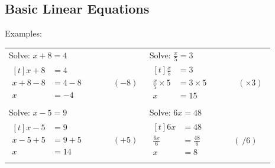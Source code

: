 \documentclass[a4paper,12pt]{article}
\renewcommand{\arraystretch}{1.5}
\begin{document}
\subsection{Basic Linear Equations}
Examples:
\renewcommand{\tabcolsep}{16pt}
\renewcommand{\arraystretch}{2}
\begin{center}
\begin{tabular}{ p{6cm} | p{6cm} }\hline
Solve: $x+8 = 4$ & Solve: $\displaystyle \frac{x}{5}=3$ \\
$\begin{aligned}[t] %
x + 8 &= 4 &\\
x + 8 - 8 &= 4 - 8 &\text{~~~~~~~~~}(-8)\\
x &= -4 &\text{~~~~~~~~~}\\
\end{aligned}$
& 
$\begin{aligned}[t] %
\frac{x}{5} &= 3 &\\
\frac{x}{5} \times 5 &= 3 \times 5 &\text{~~~~~~~~~}(\times 3)\\
x &= 15 &\text{~~~~~~~~~}\\
\end{aligned}$
\\\hline
Solve: $x-5= 9$ & Solve: $\displaystyle 6x=48$ \\
$\begin{aligned}[t] %
x - 5 &= 9 &\\
x - 5 + 5 &= 9 + 5 &\text{~~~~~~~~~}(+5)\\
x &= 14 &\text{~~~~~~~~~}\\
\end{aligned}$
& 
$\begin{aligned}[t] %
6x&=48 &\\
\frac{6x}{6} &= \frac{48}{6} &\text{~~~~~~~~~}(\ / 6)\\
x &= 8 &\text{~~~~~~~~~}\\
\end{aligned}$
\\\hline
\end{tabular}
\end{center}\vspace{0.5cm}
\end{document}
